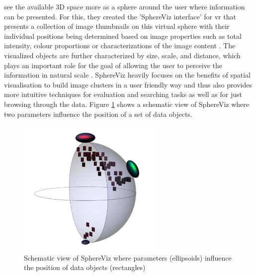 \cite{Soldati2007} see the available 3D space more as a sphere around the user where information can be presented. For this, they created the 'SphereViz interface' for \gls{vr} that presents a collection of image thumbnails on this virtual sphere with their individual positions being determined based on image properties such as total intensity, colour proportions or characterizations of the image content \citep{Soldati2007}. The visualized objects are further characterized by size, scale, and distance, which plays an important role for the goal of allowing the user to perceive the information in natural scale \citep{Soldati2007}. SphereViz heavily focuses on the benefits of spatial visualisation to build image clusters in a user friendly way and thus also provides more intuitive techniques for evaluation and searching tasks as well as for just browsing through the data. Figure \ref{fig:sphereviz} shows a schematic view of SphereViz where two parameters influence the position of a set of data objects.
\begin{figure}[t]
	\begin{center}
		\includegraphics[width=7cm]{03_Figures/05_LitReview/Soldati2007_SphereViz.png}
		\caption[Schematic view of SphereViz where parameters influence the position of data objects]{Schematic view of SphereViz where parameters (ellipsoids) influence the position of data objects (rectangles) \citep{Soldati2007}}
		\label{fig:sphereviz}
	\end{center}
\end{figure} \newline
